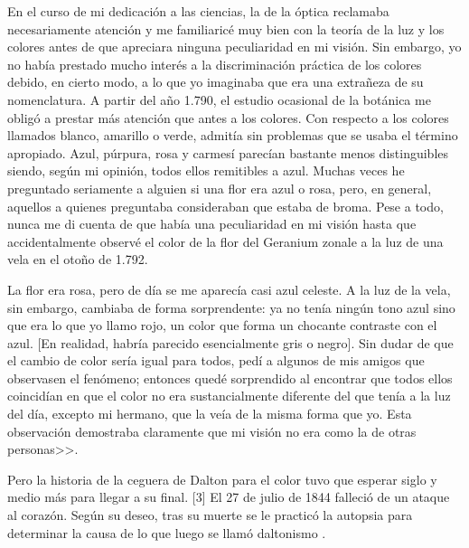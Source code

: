 \documentclass[10pt]{article}
\begin{document}
\setlength{\parskip}{2mm}

En el curso de mi dedicación a las ciencias, la de la óptica reclamaba necesariamente atención y me familiaricé muy bien con la teoría de la luz y los colores antes de que apreciara ninguna peculiaridad en mi visión. Sin embargo, yo no había prestado mucho interés a la discriminación práctica de los colores debido, en cierto modo, a lo que yo imaginaba que era una extrañeza de su nomenclatura. A partir del año 1.790, el estudio ocasional de la botánica me obligó a prestar más atención que antes a los colores. Con respecto a los colores llamados blanco, amarillo o verde, admitía sin problemas que se usaba el término apropiado. Azul, púrpura, rosa y carmesí parecían bastante menos distinguibles siendo, según mi opinión, todos ellos remitibles a azul. Muchas veces he preguntado seriamente a alguien si una flor era azul o rosa, pero, en general, aquellos a quienes preguntaba consideraban que estaba de broma. Pese a todo, nunca me di cuenta de que había una peculiaridad en mi visión hasta que accidentalmente observé el color de la flor del Geranium zonale a la luz de una vela en el otoño de 1.792.

\setlength{\parskip}{2mm}

La flor era rosa, pero de día se me aparecía casi azul celeste. A la luz de la vela, sin embargo, cambiaba de forma sorprendente: ya no tenía ningún tono azul sino que era lo que yo llamo rojo, un color que forma un chocante contraste con el azul. [En realidad, habría parecido esencialmente gris o negro]. Sin dudar de que el cambio de color sería igual para todos, pedí a algunos de mis amigos que observasen el fenómeno; entonces quedé sorprendido al encontrar que todos ellos coincidían en que el color no era sustancialmente diferente del que tenía a la luz del día, excepto mi hermano, que la veía de la misma forma que yo. Esta observación demostraba claramente que mi visión no era como la de otras personas>>\cite{IEEEreferencias:Ref3}.

\setlength{\parskip}{2mm}

Pero la historia de la ceguera de Dalton para el color tuvo que esperar siglo y medio más para llegar a su final. [3]
El 27 de julio de 1844 falleció de un ataque al corazón. Según su deseo, tras su muerte se le practicó la autopsia para determinar la causa de lo que luego se llamó daltonismo \cite{IEEEreferencias:Ref1}.

\setlength{\parskip}{2mm}
\end{document}
